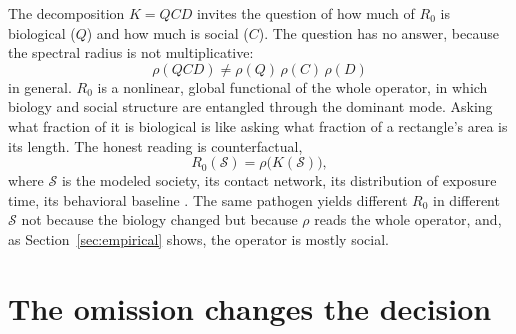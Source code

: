 \documentclass[12pt]{article}
\begin{document}
The decomposition $K=QCD$ invites the question of how much of $R_0$ is biological ($Q$) and how much is social ($C$). The question has no answer, because the spectral radius is not multiplicative:
\begin{equation}
\rho(QCD)\neq\rho(Q)\,\rho(C)\,\rho(D)
\end{equation}
in general. $R_0$ is a nonlinear, global functional of the whole operator, in which biology and social structure are entangled through the dominant mode. Asking what fraction of it is biological is like asking what fraction of a rectangle's area is its length. The honest reading is counterfactual,
\begin{equation}
R_0(\mathcal{S})=\rho\big(K(\mathcal{S})\big),
\end{equation}
where $\mathcal{S}$ is the modeled society, its contact network, its distribution of exposure time, its behavioral baseline \cite{mossong2008,fenichel2011}. The same pathogen yields different $R_0$ in different $\mathcal{S}$ not because the
biology changed but because $\rho$ reads the whole operator, and, as Section~\ref{sec:empirical} shows, the operator is mostly social.

\section{The omission changes the decision}\label{sec:decision}
\end{document}
